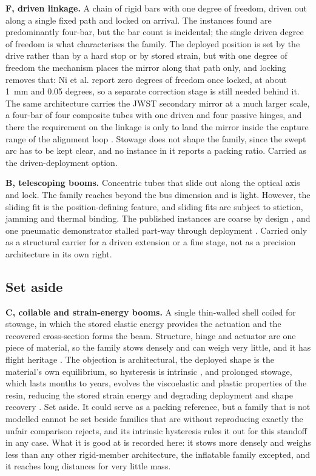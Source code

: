 \textbf{F, driven linkage.} A chain of rigid bars with one degree of freedom, driven out along a single fixed path and locked on arrival. The instances found are predominantly four-bar, but the bar count is incidental; the single driven degree of freedom is what characterises the family. The deployed position is set by the drive rather than by a hard stop or by stored strain, but with one degree of freedom the mechanism places the mirror along that path only, and locking removes that: Ni et al. \cite{ni_four-bar_2019} report zero degrees of freedom once locked, at about \SI{1}{\milli\meter} and 0.05 degrees, so a separate correction stage is still needed behind it. The same architecture carries the JWST secondary mirror at a much larger scale, a four-bar of four composite tubes with one driven and four passive hinges, and there the requirement on the linkage is only to land the mirror inside the capture range of the alignment loop \cite{lightsey_james_2012}. Stowage does not shape the family, since the swept arc has to be kept clear, and no instance in it reports a packing ratio. Carried as the driven-deployment option.

\textbf{B, telescoping booms.} Concentric tubes that slide out along the optical axis and lock. The family reaches beyond the bus dimension and is light. However, the sliding fit is the position-defining feature, and sliding fits are subject to stiction, jamming and thermal binding. The published instances are coarse by design \cite{reveles_development_2015}, and one pneumatic demonstrator stalled part-way through deployment \cite{badea_proof_2025}. Carried only as a structural carrier for a driven extension or a fine stage, not as a precision architecture in its own right.


\subsection*{Set aside}

\textbf{C, coilable and strain-energy booms.} A single thin-walled shell coiled for stowage, in which the stored elastic energy provides the actuation and the recovered cross-section forms the beam. Structure, hinge and actuator are one piece of material, so the family stows densely and can weigh very little, and it has flight heritage \cite{belvin_advanced_2016, wang_space_2024, liu_thin-walled_2024}. The objection is architectural, the deployed shape is the material's own equilibrium, so hysteresis is intrinsic \cite{black_deployment_2006}, and prolonged stowage, which lasts months to years, evolves the viscoelastic and plastic properties of the resin, reducing the stored strain energy and degrading deployment and shape recovery \cite{liu_thin-walled_2024, thaker_tape_2024}. Set aside. It could serve as a packing reference, but a family that is not modelled cannot be set beside families that are without reproducing exactly the unfair comparison  rejects, and its intrinsic hysteresis rules it out for this standoff in any case. What it is good at is recorded here: it stows more densely and weighs less than any other rigid-member architecture, the inflatable family excepted, and it reaches long distances for very little mass.

